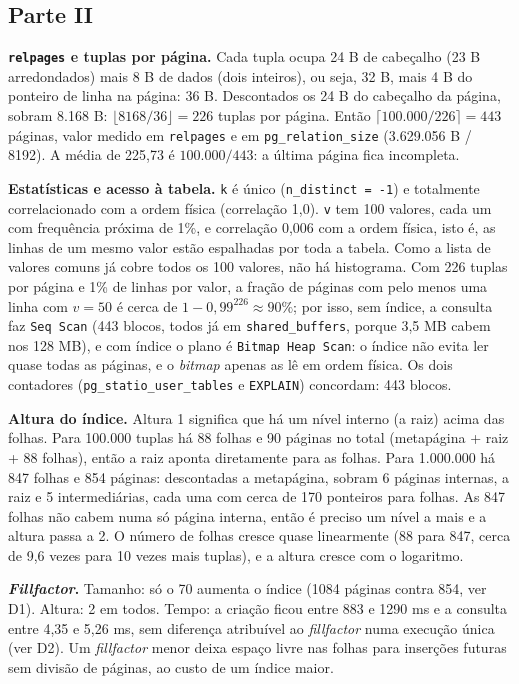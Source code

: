 \documentclass[11pt,a4paper]{article}
\newcommand{\tp}[1]{\texttt{#1}}
\begin{document}
\subsection*{Parte II}
\textbf{\tp{relpages} e tuplas por página.} Cada tupla ocupa 24 B de cabeçalho (23 B arredondados) mais 8 B de dados (dois inteiros), ou seja, 32 B, mais 4 B do ponteiro de linha na página: 36 B. Descontados os 24 B do cabeçalho da página, sobram 8.168 B: $\lfloor 8168/36 \rfloor = 226$ tuplas por página. Então $\lceil 100.000/226 \rceil = 443$ páginas, valor medido em \tp{relpages} e em \tp{pg\_relation\_size} (3.629.056 B / 8192). A média de 225,73 é $100.000/443$: a última página fica incompleta.

\textbf{Estatísticas e acesso à tabela.} \tp{k} é único (\tp{n\_distinct = -1}) e totalmente correlacionado com a ordem física (correlação 1,0). \tp{v} tem 100 valores, cada um com frequência próxima de 1\%, e correlação 0,006 com a ordem física, isto é, as linhas de um mesmo valor estão espalhadas por toda a tabela. Como a lista de valores comuns já cobre todos os 100 valores, não há histograma. Com 226 tuplas por página e 1\% de linhas por valor, a fração de páginas com pelo menos uma linha com $v = 50$ é cerca de $1 - 0{,}99^{226} \approx 90\%$; por isso, sem índice, a consulta faz \tp{Seq Scan} (443 blocos, todos já em \tp{shared\_buffers}, porque 3,5 MB cabem nos 128 MB), e com índice o plano é \tp{Bitmap Heap Scan}: o índice não evita ler quase todas as páginas, e o \emph{bitmap} apenas as lê em ordem física. Os dois contadores (\tp{pg\_statio\_user\_tables} e \tp{EXPLAIN}) concordam: 443 blocos.

\textbf{Altura do índice.} Altura 1 significa que há um nível interno (a raiz) acima das folhas. Para 100.000 tuplas há 88 folhas e 90 páginas no total (metapágina + raiz + 88 folhas), então a raiz aponta diretamente para as folhas. Para 1.000.000 há 847 folhas e 854 páginas: descontadas a metapágina, sobram 6 páginas internas, a raiz e 5 intermediárias, cada uma com cerca de 170 ponteiros para folhas. As 847 folhas não cabem numa só página interna, então é preciso um nível a mais e a altura passa a 2. O número de folhas cresce quase linearmente (88 para 847, cerca de 9,6 vezes para 10 vezes mais tuplas), e a altura cresce com o logaritmo.

\textbf{\emph{Fillfactor}.} Tamanho: só o 70 aumenta o índice (1084 páginas contra 854, ver D1). Altura: 2 em todos. Tempo: a criação ficou entre 883 e 1290 ms e a consulta entre 4,35 e 5,26 ms, sem diferença atribuível ao \emph{fillfactor} numa execução única (ver D2). Um \emph{fillfactor} menor deixa espaço livre nas folhas para inserções futuras sem divisão de páginas, ao custo de um índice maior.
\end{document}
